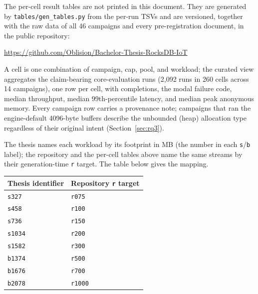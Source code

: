 
The per-cell result tables are not printed in this document.
They are generated by \texttt{tables/gen\_tables.py} from the per-run TSVs and are versioned, together with the raw data of all 46 campaigns and every pre-registration document, in the public repository:

\begin{center}
\small\url{https://github.com/Oblision/Bachelor-Thesis-RocksDB-IoT}
\end{center}

\noindent A cell is one combination of campaign, cap, pool, and workload; the curated view aggregates the claim-bearing core-evaluation runs (2{,}092 runs in 260 cells across 14 campaigns), one row per cell, with completions, the modal failure code, median throughput, median 99th-percentile latency, and median peak anonymous memory.
Every campaign row carries a provenance note; campaigns that ran the engine-default 4096-byte buffers describe the unbounded (heap) allocation type regardless of their original intent (Section~\ref{sec:rq3}).

\medskip
\noindent The thesis names each workload by its footprint in MB (the number in each \texttt{s}/\texttt{b} label); the repository and the per-cell tables above name the same streams by their generation-time \texttt{r} target. The table below gives the mapping.

\begin{center}
\begin{tabular}{|l|l|}
\hline
\textbf{Thesis identifier} & \textbf{Repository \texttt{r} target} \\
\hline
\texttt{s327}  & \texttt{r075}  \\
\hline
\texttt{s458}  & \texttt{r100}  \\
\hline
\texttt{s736}  & \texttt{r150}  \\
\hline
\texttt{s1034} & \texttt{r200}  \\
\hline
\texttt{s1582} & \texttt{r300}  \\
\hline
\texttt{b1374} & \texttt{r500}  \\
\hline
\texttt{b1676} & \texttt{r700}  \\
\hline
\texttt{b2078} & \texttt{r1000} \\
\hline
\end{tabular}
\end{center}
\label{app:workload-map}

